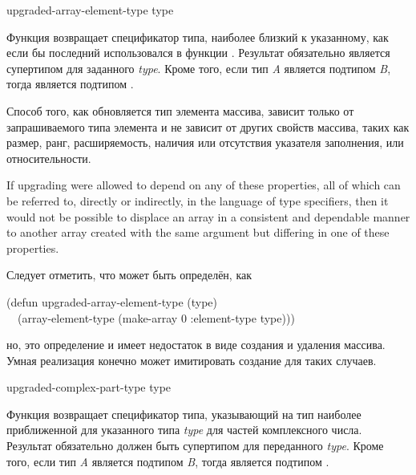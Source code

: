 \begin{defun}[Функция]
upgraded-array-element-type type

Функция возвращает спецификатор типа, наиболее близкий к указанному, как если бы
последний использовался в функции .
Результат обязательно является супертипом для заданного \emph{type}.
Кроме того, если тип \emph{A} является подтипом \emph{B}, тогда 
 является подтипом
.

Способ того, как обновляется тип элемента массива, зависит только от запрашиваемого
типа элемента и не зависит от других свойств массива, таких как размер, ранг, 
расширяемость, наличия или отсутствия указателя заполнения, или относительности.

\beforenoterule
\begin{rationale}
If upgrading were allowed to depend on any of these properties,
all of which can be referred to, directly or indirectly, in the
language of type specifiers, then it would not be possible
to displace an array in a consistent and dependable manner
to another array created with the same  argument
but differing in one of these properties.
\end{rationale}
\afternoterule

Следует отметить, что  может быть определён,
как
\begin{lisp}
(defun upgraded-array-element-type (type) \\
~~(array-element-type (make-array 0 :element-type type)))
\end{lisp}
но, это определение и имеет недостаток в виде создания и удаления массива. Умная
реализация конечно может имитировать создание для таких случаев.
\end{defun}


\begin{defun}[Функция]
upgraded-complex-part-type type

Функция возвращает спецификатор типа, указывающий на тип наиболее
приближенной для указанного типа \emph{type} для частей комплексного числа.
Результат обязательно должен быть супертипом для переданного \emph{type}.
Кроме того, если тип \emph{A} является подтипом \emph{B}, тогда
 является подтипом 
.
\end{defun}

\fi